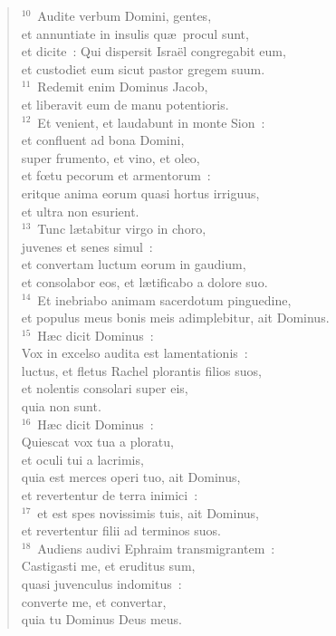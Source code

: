 \begin{flushleft}
\begin{verse}
${}^{10}$~Audite verbum Domini, gentes,\\ et annuntiate in insulis qu\ae\ procul sunt,\\ et dicite~: Qui dispersit Isra\"el congregabit eum,\\ et custodiet eum sicut pastor gregem suum.\\
${}^{11}$~Redemit enim Dominus Jacob,\\ et liberavit eum de manu potentioris.\\
${}^{12}$~Et venient, et laudabunt in monte Sion~:\\ et confluent ad bona Domini,\\ super frumento, et vino, et oleo,\\ et fœtu pecorum et armentorum~:\\ eritque anima eorum quasi hortus irriguus,\\ et ultra non esurient.\\
${}^{13}$~Tunc l\ae tabitur virgo in choro,\\ juvenes et senes simul~:\\ et convertam luctum eorum in gaudium,\\ et consolabor eos, et l\ae tificabo a dolore suo.\\
${}^{14}$~Et inebriabo animam sacerdotum pinguedine,\\ et populus meus bonis meis adimplebitur, ait Dominus.\\
${}^{15}$~H\ae c dicit Dominus~:\\ Vox in excelso audita est lamentationis~:\\ luctus, et fletus Rachel plorantis filios suos,\\ et nolentis consolari super eis,\\ quia non sunt.\\
${}^{16}$~H\ae c dicit Dominus~:\\ Quiescat vox tua a ploratu,\\ et oculi tui a lacrimis,\\ quia est merces operi tuo, ait Dominus,\\ et revertentur de terra inimici~:\\
${}^{17}$~et est spes novissimis tuis, ait Dominus,\\ et revertentur filii ad terminos suos.\\
${}^{18}$~Audiens audivi Ephraim transmigrantem~:\\ Castigasti me, et eruditus sum,\\ quasi juvenculus indomitus~:\\ converte me, et convertar,\\ quia tu Dominus Deus meus.\\

\end{verse}
\end{flushleft}
